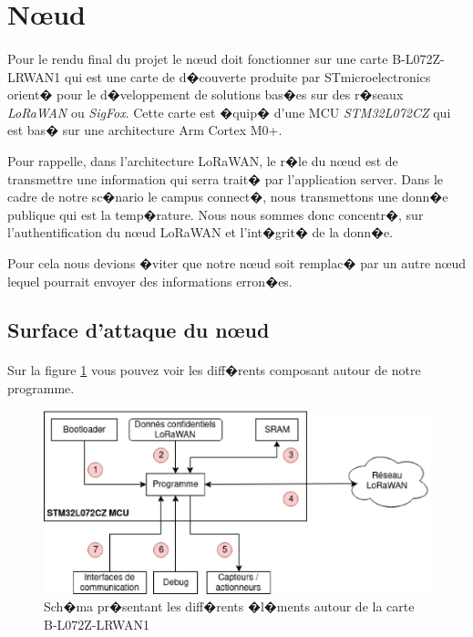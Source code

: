 \documentclass[a4paper, titlepage,12pt]{report}
\begin{document}
\section{N\oe{}ud}
\paragraph{}
Pour le rendu final du projet le n\oe{}ud doit fonctionner sur une carte B-L072Z-LRWAN1\cite{cartelora} qui est une carte de d�couverte produite par STmicroelectronics orient� pour le d�veloppement de solutions bas�es sur des r�seaux \textit{LoRaWAN} ou \textit{SigFox}. Cette carte est �quip� d'une MCU \textit{STM32L072CZ} qui est bas� sur une architecture Arm Cortex M0+.

Pour rappelle, dans l'architecture LoRaWAN, le r�le du n\oe{}ud est de transmettre une information qui serra trait� par l'application server.
Dans le cadre de notre sc�nario le campus connect�, nous transmettons une donn�e publique qui est la temp�rature. Nous nous sommes donc concentr�, sur l'authentification du n\oe{}ud LoRaWAN et l'int�grit� de la donn�e.

Pour cela nous devions �viter que notre n\oe{}ud soit remplac� par un autre n\oe{}ud lequel pourrait envoyer des informations erron�es.

\subsection{Surface d'attaque du n\oe{}ud}
\paragraph{}
Sur la figure \ref{Sch�ma vecteur attaque B-L072Z-LRWAN1} vous pouvez voir les diff�rents composant autour de notre programme.
\begin{figure}[!h]
\centering
\includegraphics[scale=0.75]{img/eps/ModeledemenaceNoued.eps}
\caption{Sch�ma pr�sentant les diff�rents �l�ments autour de la carte B-L072Z-LRWAN1}
\label{Sch�ma vecteur attaque B-L072Z-LRWAN1}
\end{figure}
\end{document}
